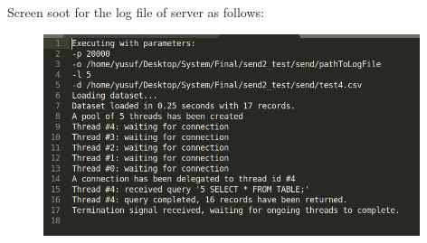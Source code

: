 \documentclass[10pt,english, openany]{book}
\begin{document}
Screen soot for the log file of server as follows:

\begin{figure}[htp]
    \centering
    \includegraphics[width=11cm]{output.PNG}
    
\end{figure}
\end{document}
